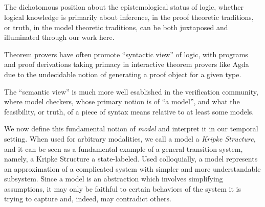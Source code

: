 \documentclass{article}
\begin{document}
\begin{code}%
\>[0]\AgdaSpace{}%
\AgdaSymbol{:}\AgdaSpace{}%
\AgdaSpace{}%
\AgdaSpace{}%
\<%
\\
\>[0]\AgdaSpace{}%
\AgdaSpace{}%
\AgdaSymbol{=}\AgdaSpace{}%
\AgdaSpace{}%
\AgdaSpace{}%
\AgdaSpace{}%
\AgdaSpace{}%
\<%
\\
%
\\[\AgdaEmptyExtraSkip]%
\>[0]\AgdaSpace{}%
\AgdaSymbol{:}\AgdaSpace{}%
\AgdaSymbol{\{}\AgdaSpace{}%
\AgdaSymbol{:}\AgdaSpace{}%
\AgdaSymbol{\}}\AgdaSpace{}%
\AgdaSpace{}%
\AgdaSpace{}%
\AgdaSpace{}%
\AgdaSpace{}%
\<%
\\
\>[0]\AgdaSpace{}%
\AgdaSymbol{\{}\AgdaSymbol{\}}\AgdaSpace{}%
\AgdaSpace{}%
\AgdaSymbol{=}\AgdaSpace{}%
\AgdaSpace{}%
\AgdaSymbol{(}\AgdaSpace{}%
\AgdaSymbol{:}\AgdaSpace{}%
\AgdaSymbol{)}\AgdaSpace{}%
\AgdaSpace{}%
\AgdaFunction{Σ[}\AgdaSpace{}%
\AgdaSpace{}%
\AgdaSpace{}%
\AgdaSpace{}%
\AgdaFunction{]}\AgdaSpace{}%
\AgdaSymbol{(}\AgdaSpace{}%
\AgdaSpace{}%
\AgdaSymbol{)}\<%
\end{code}

The dichotomous position about the epistemological status of logic, whether
logical knowledge is primarily about inference, in the proof theoretic
traditions, or truth, in the model theoretic traditions, can be both juxtaposed
and illuminated through our work here.

Theorem provers have often promote ``syntactic view'' of logic, with programs
and proof derivations taking primacy in interactive theorem provers like Agda
due to the undecidable notion of generating a proof object for a given type.

The ``semantic view'' is much more well esablished in the verification
community, where model checkers, whose primary notion is of ``a model'', and
what the feasibility, or truth, of a piece of syntax means relative to at least
some models.

We now define this fundamental notion of \emph{model} and
interpret it in our temporal setting. When used for arbitrary modalities, we
call a model a \emph{Kripke Structure}, and it can be seen as a fundamental
example of a general transition system, namely, a Kripke Structure a state-labeled. Used
colloquially, a model represents an approximation of a complicated system with
simpler and more understandable subsystem. Since a model is an abstraction which
involves simplifying assumptions, it may only be faithful to certain behaviors
of the system it is trying to capture and, indeed, may contradict others.
\end{document}
